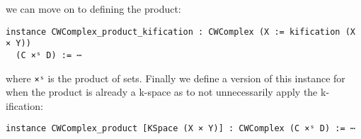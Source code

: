 we can move on to defining the product: 

\begin{lstlisting}
instance CWComplex_product_kification : CWComplex (X := kification (X × Y)) 
  (C ×ˢ D) := ⋯
\end{lstlisting}

where \lstinline{×ˢ} is the product of sets.
Finally we define a version of this instance for when the product is already a k-space as to not unnecessarily apply the k-ification: 

\begin{lstlisting}
instance CWComplex_product [KSpace (X × Y)] : CWComplex (C ×ˢ D) := ⋯
\end{lstlisting}